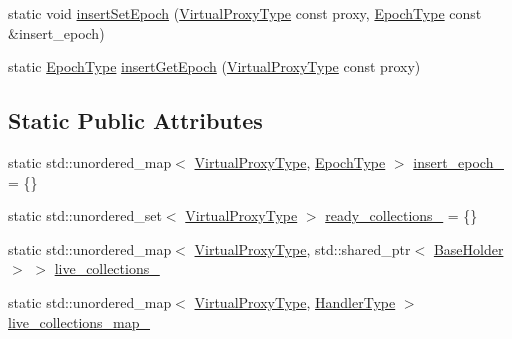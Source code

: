 \begin{DoxyCompactItemize}
\item 
static void \hyperlink{structvt_1_1vrt_1_1collection_1_1_universal_index_holder_a8193db85d822ff2783925ef2a5ac3b17}{insert\+Set\+Epoch} (\hyperlink{namespacevt_a1b417dd5d684f045bb58a0ede70045ac}{Virtual\+Proxy\+Type} const proxy, \hyperlink{namespacevt_a985a5adf291c34a3ca263b3378388236}{Epoch\+Type} const \&insert\+\_\+epoch)
\item 
static \hyperlink{namespacevt_a985a5adf291c34a3ca263b3378388236}{Epoch\+Type} \hyperlink{structvt_1_1vrt_1_1collection_1_1_universal_index_holder_a45b646ebb0be1787d3893f4e719ed031}{insert\+Get\+Epoch} (\hyperlink{namespacevt_a1b417dd5d684f045bb58a0ede70045ac}{Virtual\+Proxy\+Type} const proxy)
\end{DoxyCompactItemize}
\subsection*{Static Public Attributes}
\begin{DoxyCompactItemize}
\item 
static std\+::unordered\+\_\+map$<$ \hyperlink{namespacevt_a1b417dd5d684f045bb58a0ede70045ac}{Virtual\+Proxy\+Type}, \hyperlink{namespacevt_a985a5adf291c34a3ca263b3378388236}{Epoch\+Type} $>$ \hyperlink{structvt_1_1vrt_1_1collection_1_1_universal_index_holder_a9fbea00587a7d5028c3ae3cf124a3930}{insert\+\_\+epoch\+\_\+} = \{\}
\item 
static std\+::unordered\+\_\+set$<$ \hyperlink{namespacevt_a1b417dd5d684f045bb58a0ede70045ac}{Virtual\+Proxy\+Type} $>$ \hyperlink{structvt_1_1vrt_1_1collection_1_1_universal_index_holder_a68ef587e677d634684e27732e9cbf8e8}{ready\+\_\+collections\+\_\+} = \{\}
\item 
static std\+::unordered\+\_\+map$<$ \hyperlink{namespacevt_a1b417dd5d684f045bb58a0ede70045ac}{Virtual\+Proxy\+Type}, std\+::shared\+\_\+ptr$<$ \hyperlink{structvt_1_1vrt_1_1collection_1_1_base_holder}{Base\+Holder} $>$ $>$ \hyperlink{structvt_1_1vrt_1_1collection_1_1_universal_index_holder_af67ddae79d782cc9c51a13e34997cd59}{live\+\_\+collections\+\_\+}
\item 
static std\+::unordered\+\_\+map$<$ \hyperlink{namespacevt_a1b417dd5d684f045bb58a0ede70045ac}{Virtual\+Proxy\+Type}, \hyperlink{namespacevt_af64846b57dfcaf104da3ef6967917573}{Handler\+Type} $>$ \hyperlink{structvt_1_1vrt_1_1collection_1_1_universal_index_holder_a42b948be40223918c12a531e2f7a290e}{live\+\_\+collections\+\_\+map\+\_\+}
\end{DoxyCompactItemize}


